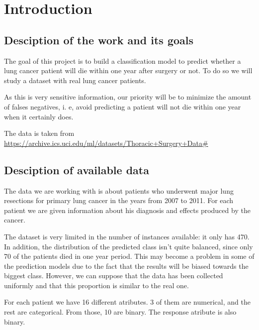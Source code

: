 \section{Introduction}

\subsection{Desciption of the work and its goals}

The goal of this project is to build a classification model to predict whether
a lung cancer patient will die within one year after surgery or not. To do so
we will study a dataset with real lung cancer patients.

As this is very sensitive information, our priority will be to minimize the
amount of falses negatives, i. e, avoid predicting a patient will not die within
one year when it certainly does.


The data is taken from
\url{https://archive.ics.uci.edu/ml/datasets/Thoracic+Surgery+Data#}
\cite{zieba2013boosted}

\subsection{Desciption of available data}

The data we are working with is about patients who underwent major lung
resections for primary lung cancer in the years from 2007 to 2011. For each
patient we are given information about his diagnosis and effects produced
by the cancer.

The dataset is very limited in the number of instances available: it only has
470. In addition, the distribution of the predicted class isn't quite balanced,
since only 70 of the patients died in one year period. This may become a problem
in some of the prediction models due to the fact that the results will be biased
towards the biggest class. However, we can suppose that the data has been
collected uniformly and that this proportion is similar to the real one.

For each patient we have 16 different atributes. 3 of them are numerical, and
the rest are categorical. From those, 10 are binary. The response atribute is
also binary.
